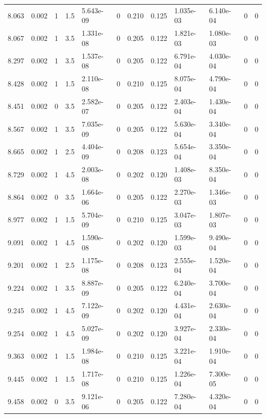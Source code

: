 \documentclass[preview]{standalone}
\begin{document}
{{{\begin{tabular}{L{1.2cm}C{1.2cm} C{0.3cm}C{0.5cm} C{1.4cm}C{1.4cm} C{1.4cm}C{1.4cm} C{1.6cm}C{1.6cm} C{1.6cm}C{1.6cm}}
  8.063  &  0.002  & 1     & 1.5 &  5.643e-09  & 0  &  0.210&   0.125& 1.035e-03 & 6.140e-04   &  0 & 0  \\ 
  8.067  &  0.002  & 1     & 3.5 &  1.331e-08  & 0  &  0.205&   0.122& 1.821e-03 & 1.080e-03   &  0 & 0  \\ 
  8.297  &  0.002  & 1     & 3.5 &  1.537e-08  & 0  &  0.205&   0.122& 6.791e-04 & 4.030e-04   &  0 & 0  \\ 
  8.428  &  0.002  & 1     & 1.5 &  2.110e-08  & 0  &  0.210&   0.125& 8.075e-04 & 4.790e-04   &  0 & 0  \\ 
  8.451  &  0.002  & 0     & 3.5 &  2.582e-07  & 0  &  0.205&   0.122& 2.403e-04 & 1.430e-04   &  0 & 0  \\ 
  8.567  &  0.002  & 1     & 3.5 &  7.035e-09  & 0  &  0.205&   0.122& 5.630e-04 & 3.340e-04   &  0 & 0  \\ 
  8.665  &  0.002  & 1     & 2.5 &  4.404e-09  & 0  &  0.208&   0.123& 5.654e-04 & 3.350e-04   &  0 & 0  \\ 
  8.729  &  0.002  & 1     & 4.5 &  2.003e-08  & 0  &  0.202&   0.120& 1.408e-03 & 8.350e-04   &  0 & 0  \\ 
  8.864  &  0.002  & 0     & 3.5 &  1.664e-06  & 0  &  0.205&   0.122& 2.270e-03 & 1.346e-03   &  0 & 0  \\ 
  8.977  &  0.002  & 1     & 1.5 &  5.704e-09  & 0  &  0.210&   0.125& 3.047e-03 & 1.807e-03   &  0 & 0  \\ 
  9.091  &  0.002  & 1     & 4.5 &  1.590e-08  & 0  &  0.202&   0.120& 1.599e-03 & 9.490e-04   &  0 & 0  \\ 
  9.201  &  0.002  & 1     & 2.5 &  1.175e-08  & 0  &  0.208&   0.123& 2.555e-04 & 1.520e-04   &  0 & 0  \\ 
  9.224  &  0.002  & 1     & 3.5 &  8.887e-09  & 0  &  0.205&   0.122& 6.240e-04 & 3.700e-04   &  0 & 0  \\ 
  9.245  &  0.002  & 1     & 4.5 &  7.122e-09  & 0  &  0.202&   0.120& 4.431e-04 & 2.630e-04   &  0 & 0  \\ 
  9.254  &  0.002  & 1     & 4.5 &  5.027e-09  & 0  &  0.202&   0.120& 3.927e-04 & 2.330e-04   &  0 & 0  \\ 
  9.363  &  0.002  & 1     & 1.5 &  1.984e-08  & 0  &  0.210&   0.125& 3.221e-04 & 1.910e-04   &  0 & 0  \\ 
  9.445  &  0.002  & 1     & 1.5 &  1.717e-08  & 0  &  0.210&   0.125& 1.226e-04 & 7.300e-05   &  0 & 0  \\ 
  9.458  &  0.002  & 0     & 3.5 &  9.121e-06  & 0  &  0.205&   0.122& 7.280e-04 & 4.320e-04   &  0 & 0  \\ 

\end{tabular}}}}
\end{document}
